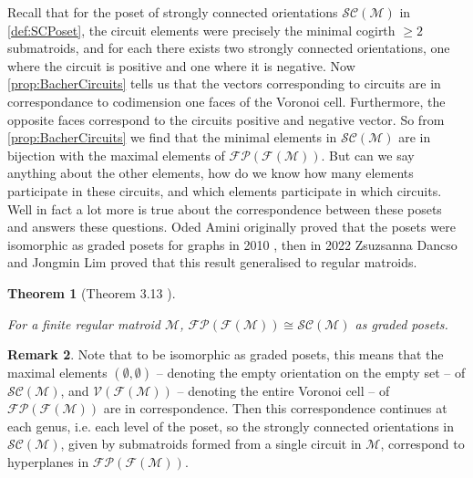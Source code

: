 \documentclass[12pt]{report}
\newtheorem{theorem}{Theorem}[chapter]
\theoremstyle{definition}
\newtheorem{remark}[theorem]{Remark}
\def\calC{\mathcal C}
\def\calF{\mathcal F}
\def\calM{\mathcal M}
\def\calP{\mathcal P}
\def\calS{\mathcal S}
\def\calV{\mathcal V}
\theoremstyle{upright}
\begin{document}
Recall that for the poset of strongly connected orientations $\calS\calC(\calM)$ in \cref{def:SCPoset}, the circuit elements were precisely the minimal cogirth $\geq2$ submatroids, and for each there exists two strongly connected orientations, one where the circuit is positive and one where it is negative.
Now \cref{prop:BacherCircuits} tells us that the vectors corresponding to circuits are in correspondance to codimension one faces of the Voronoi cell.
Furthermore, the opposite faces correspond to the circuits positive and negative vector.
So from \cref{prop:BacherCircuits} we find that the minimal elements in $\calS\calC(\calM)$ are in bijection with the maximal elements of $\calF\calP(\calF(\calM))$.
But can we say anything about the other elements, how do we know how many elements participate in these circuits, and which elements participate in which circuits.
Well in fact a lot more is true about the correspondence between these posets and answers these questions.
Oded Amini originally proved that the posets were isomorphic as graded posets for graphs in 2010 \cite{amini2010lattice}, then in 2022 Zsuzsanna Dancso and Jongmin Lim \cite{dancso2023lattice} proved that this result generalised to regular matroids.

\begin{theorem}[Theorem 3.13 \cite{dancso2023lattice}]\label{thm:AminiDL}

    For a finite regular matroid $\calM$, $\calF\calP(\calF(\calM))\cong\calS\calC(\calM)$ as graded posets.
    
\end{theorem}

\begin{remark}

    Note that to be isomorphic as graded posets, this means that the maximal elements $(\emptyset, \emptyset)$ -- denoting the empty orientation on the empty set -- of $\calS\calC(\calM)$, and $\calV(\calF(\calM))$ -- denoting the entire Voronoi cell -- of $\calF\calP(\calF(\calM))$ are in correspondence.
    Then this correspondence continues at each genus, i.e. each level of the poset, so the strongly connected orientations in $\calS\calC(\calM)$, given by submatroids formed from a single circuit in $\calM$, correspond to hyperplanes in $\calF\calP(\calF(\calM))$.
    
\end{remark}
\end{document}
